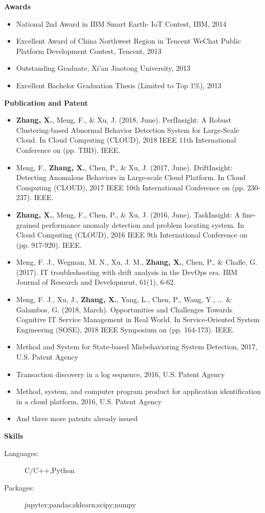 \documentclass[letterpaper,11pt]{article}
\newcommand{\resheading}[1]{{\large \colorbox{mygrey}{\begin{minipage}{\textwidth}{\textbf{#1 \vphantom{p\^{E}}}}\end{minipage}}}}
\begin{document}
\resheading{Awards}
	\begin{itemize}
		\item
			National 2nd Award in IBM Smart Earth- IoT Contest, IBM, 2014
		\item
			Excellent Award of China Northwest Region in Tencent WeChat Public Platform Development Contest, Tencent, 2013
		\item
			Outstanding Graduate, Xi'an Jiaotong University, 2013
		\item
			Excellent Bachelor Graduation Thesis (Limited to Top 1\%), 2013
	\end{itemize}
	

	



\resheading{Publication and Patent}
	\begin{itemize}
		\item
			\textbf{Zhang, X.}, Meng, F., \& Xu, J. (2018, June).  PerfInsight: A Robust Clustering-based Abnormal Behavior Detection System for Large-Scale Cloud. In Cloud Computing (CLOUD), 2018 IEEE 11th International Conference on (pp. TBD). IEEE.
		\item
			Meng, F., \textbf{Zhang, X.}, Chen, P., \& Xu, J. (2017, June). DriftInsight: Detecting Anomalous Behaviors in Large-scale Cloud Platform. In Cloud Computing (CLOUD), 2017 IEEE 10th International Conference on (pp. 230-237). IEEE.
		\item
			\textbf{Zhang, X.}, Meng, F., Chen, P., \& Xu, J. (2016, June). TaskInsight: A fine-grained performance anomaly detection and problem locating system. In Cloud Computing (CLOUD), 2016 IEEE 9th International Conference on (pp. 917-920). IEEE.
		\item
			Meng, F. J., Wegman, M. N., Xu, J. M., \textbf{Zhang, X.}, Chen, P., \& Chafle, G. (2017). IT troubleshooting with drift analysis in the DevOps era. IBM Journal of Research and Development, 61(1), 6-62.
		\item
			Meng, F. J., Xu, J., \textbf{Zhang, X.}, Yang, L., Chen, P., Wang, Y., ... \& Galambos, G. (2018, March). Opportunities and Challenges Towards Cognitive IT Service Management in Real World. In Service-Oriented System Engineering (SOSE), 2018 IEEE Symposium on (pp. 164-173). IEEE.
		\item
			Method and System for State-based Misbehavioring System Detection, 2017, U.S. Patent Agency
		\item
			Transaction discovery in a log sequence, 2016, U.S. Patent Agency
		\item
			Method, system, and computer program product for application identification in a cloud platform, 2016, U.S. Patent Agency
		\item
			And three more patents already issued
		\end{itemize}

\resheading{Skills}
	\begin{description}
		\item[Languages:] { \footnotesize C/C++,Python}
		\item[Packages:]{\footnotesize {jupyter};{pandas};{sklearn};{scipy};{numpy}}  
	\end{description} %
\end{document}
